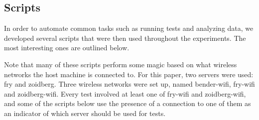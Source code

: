 \subsection{Scripts}
\label{sec:met:scripts}
In order to automate common tasks such as running tests and analyzing
data, we developed several scripts that were then used throughout the
experiments. The most interesting ones are outlined below.

Note that many of these scripts perform some magic based on what wireless networks
the host machine is connected to. For this paper, two servers were used: fry and
zoidberg. Three wireless networks were set up, named bender-wifi, fry-wifi and
zoidberg-wifi. Every test involved at least one of fry-wifi and zoidberg-wifi,
and some of the scripts below use the presence of a connection to one of them as
an indicator of which server should be used for tests.

